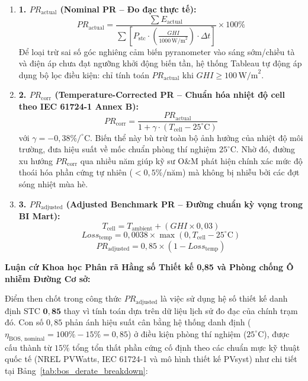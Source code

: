 \documentclass[12pt, a4paper]{report}
\begin{document}
\begin{enumerate}[label=\arabic*., leftmargin=*]
    \item \textbf{1. $PR_{\text{actual}}$ (Nominal PR -- Đo đạc thực tế):}
    \begin{equation}
        PR_{\text{actual}} = \frac{\sum E_{\text{actual}}}{\sum \left[ P_{\text{stc}} \cdot \left(\frac{GHI}{1000\,\text{W/m}^2}\right) \cdot \Delta t \right]} \times 100\%
    \end{equation}
    Để loại trừ sai số góc nghiêng cảm biến pyranometer vào sáng sớm/chiều tà và điện áp chưa đạt ngưỡng khởi động biến tần, hệ thống Tableau tự động áp dụng bộ lọc điều kiện: chỉ tính toán $PR_{\text{actual}}$ khi $GHI \ge 100\,\text{W/m}^2$.

    \item \textbf{2. $PR_{\text{corr}}$ (Temperature-Corrected PR -- Chuẩn hóa nhiệt độ cell theo IEC 61724-1 Annex B):}
    \begin{equation}
        PR_{\text{corr}} = \frac{PR_{\text{actual}}}{1 + \gamma \cdot (T_{\text{cell}} - 25^\circ\text{C})}
    \end{equation}
    với $\gamma = -0{,}38\%/^\circ\text{C}$. Biến thể này bù trừ toàn bộ ảnh hưởng của nhiệt độ môi trường, đưa hiệu suất về mốc chuẩn phòng thí nghiệm $25^\circ\text{C}$. Nhờ đó, đường xu hướng $PR_{\text{corr}}$ qua nhiều năm giúp kỹ sư O\&M phát hiện chính xác mức độ thoái hóa phần cứng tự nhiên ($< 0{,}5\%/\text{năm}$) mà không bị nhiễu bởi các đợt sóng nhiệt mùa hè.

    \item \textbf{3. $PR_{\text{adjusted}}$ (Adjusted Benchmark PR -- Đường chuẩn kỳ vọng trong BI Mart):}
    \begin{equation}
        T_{\text{cell}} = T_{\text{ambient}} + (GHI \times 0{,}03)
    \end{equation}
    \begin{equation}
        Loss_{\text{temp}} = 0{,}0038 \times \max(0, T_{\text{cell}} - 25^\circ\text{C})
    \end{equation}
    \begin{equation}
        PR_{\text{adjusted}} = 0{,}85 \times (1 - Loss_{\text{temp}})
    \end{equation}
\end{enumerate}

\textbf{Luận cứ Khoa học Phân rã Hằng số Thiết kế 0,85 và Phòng chống Ô nhiễm Đường Cơ sở:}

Điểm then chốt trong công thức $PR_{\text{adjusted}}$ là việc sử dụng hệ số thiết kế danh định STC $\mathbf{0{,}85}$ thay vì tính toán dựa trên dữ liệu lịch sử đo đạc của chính trạm đó. Con số $0{,}85$ phản ánh hiệu suất cân bằng hệ thống danh định ($\eta_{\text{BOS, nominal}} = 100\% - 15\% = 0{,}85$) ở điều kiện phòng thí nghiệm ($25^\circ\text{C}$), được cấu thành từ $15\%$ tổng tổn thất phần cứng cố định theo các chuẩn mực kỹ thuật quốc tế (NREL PVWatts, IEC 61724-1 và mô hình thiết kế PVsyst) như chi tiết tại Bảng~\ref{tab:bos_derate_breakdown}:
\end{document}
